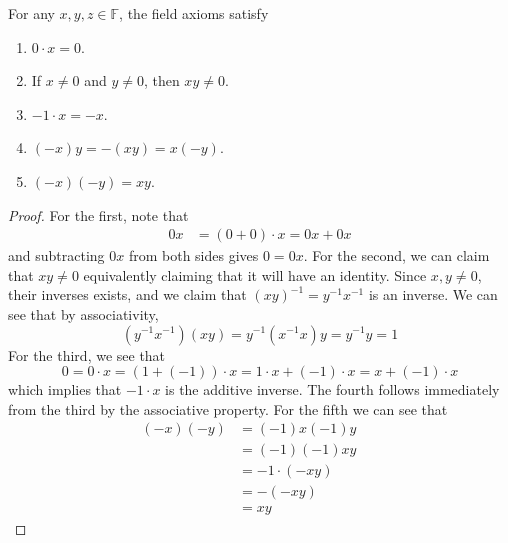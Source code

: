 \documentclass{article}
\begin{document}
      \begin{lemma}
        For any $x, y, z \in \mathbb{F}$, the field axioms satisfy 
        \begin{enumerate}
          \item $0 \cdot x = 0$.
          \item If $x \neq 0$ and $y \neq 0$, then $x y \neq 0$.
          \item $-1 \cdot x = -x$. 
          \item $(-x) y = - (xy) = x (-y)$. 
          \item $(-x) (-y) = xy$. 
        \end{enumerate}
      \end{lemma} 
      \begin{proof}
        For the first, note that 
        \begin{align}
          0 x & = (0 + 0) \cdot x = 0 x + 0x 
        \end{align}
        and subtracting $0x$ from both sides gives $0 = 0x$. For the second, we can claim that $xy \neq 0$ equivalently claiming that it will have an identity. Since $x, y \neq 0$, their inverses exists, and we claim that $(xy)^{-1} = y^{-1} x^{-1}$ is an inverse. We can see that by associativity, 
        \begin{equation}
          (y^{-1} x^{-1}) (xy) = y^{-1} (x^{-1} x) y = y^{-1} y = 1
        \end{equation} 
        For the third, we see that 
        \begin{equation}
          0 = 0 \cdot x = (1 + (-1)) \cdot x = 1 \cdot x + (-1) \cdot x = x + (-1) \cdot x 
        \end{equation}
        which implies that $-1 \cdot x$ is the additive inverse. The fourth follows immediately from the third by the associative property. For the fifth we can see that 
        \begin{align}
          (-x) (-y) & = (-1) x (-1) y && \tag{property 3} \\
                    & = (-1) (-1) x y && \tag{$\times$ is commutative} \\
                    & = -1 \cdot (-xy) && \tag{property 3} \\
                    & = -(-xy) && \tag{property 3} \\
                    & = xy && \tag{addition property 4}
        \end{align}
      \end{proof}
\end{document}
